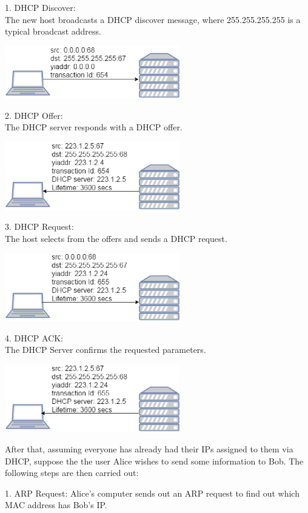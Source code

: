 \documentclass{acm_proc_article-sp}
\begin{document}
1. DHCP Discover: \\
The new host broadcasts a DHCP discover message, where 255.255.255.255 is a typical broadcast address.  

\includegraphics[width=3in]{DHCP_Discover.eps}

2. DHCP Offer: \\
The DHCP server responds with a DHCP offer. 

\includegraphics[width=3in]{DHCP_Offer.eps}

3. DHCP Request: \\
The host selects from the offers and sends a DHCP request. 

\includegraphics[width=3in]{DHCP_Request.eps}

4. DHCP ACK: \\ 
The DHCP Server confirms the requested parameters. 

\includegraphics[width=3in]{DHCP_Ack.eps}


After that, assuming everyone has already had their IPs assigned to them via DHCP, suppose the the user Alice wishes to send some information to Bob. The following steps are then carried out: 

1. ARP Request: Alice's computer sends out an ARP request to find out which MAC address has Bob's IP. 
\end{document}
